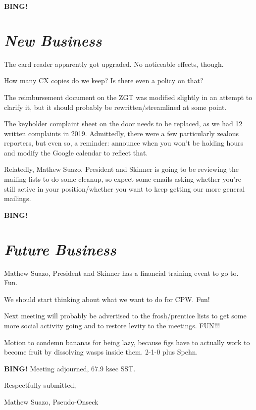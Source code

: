 \documentclass[10pt]{article}
\newcommand{\bing}{{\bf BING!} }
\newcommand{\goto}[1]{\bing \vskip 12pt \section*{{\em{#1}}}}
\newcommand{\ps}{ plus Spehn\xspace}
\newcommand{\skinner}{Mathew Suazo, President and Skinner\xspace}
\newcommand{\onseck}{Mathew Suazo, Pseudo-Onseck\xspace}
\begin{document}
\goto{New Business}

The card reader apparently got upgraded. No noticeable effects, though.

How many CX copies do we keep? Is there even a policy on that?

The reimbursement document on the ZGT was modified slightly in an attempt to clarify it, but it should probably be rewritten/streamlined at some point.

The keyholder complaint sheet on the door needs to be replaced, as we had 12 written complaints in 2019. Admittedly, there were a few particularly zealous reporters, but even so, a reminder: announce when you won't be holding hours and modify the Google calendar to reflect that.

Relatedly, \skinner is going to be reviewing the mailing lists to do some cleanup, so expect some emails asking whether you're still active in your position/whether you want to keep getting our more general mailings.

\goto{Future Business}

\skinner has a financial training event to go to. Fun.

We should start thinking about what we want to do for CPW. Fun!

Next meeting will probably be advertised to the frosh/prentice lists to get some more social activity going and to restore levity to the meetings. FUN!!!

Motion to condemn bananas for being lazy, because figs have to actually work to become fruit by dissolving wasps inside them. 2-1-0 \ps.

\bing
\noindent
Meeting adjourned, 67.9 ksec SST.

\vspace{18pt}

\centerline{Respectfully submitted,}
\centerline{\onseck}
\end{document}
